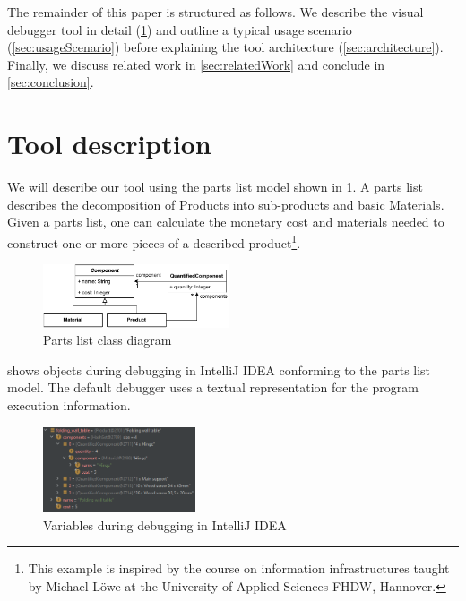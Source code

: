 \documentclass[conference]{IEEEtran}
\newcommand{\intellij}{IntelliJ IDEA}
\begin{document}
The remainder of this paper is structured as follows.
We describe the visual debugger tool in detail (\cref{sec:toolDescription}) and outline a typical usage scenario (\cref{sec:usageScenario}) before explaining the tool architecture (\cref{sec:architecture}).
Finally, we discuss related work in \cref{sec:relatedWork} and conclude in \cref{sec:conclusion}.

\section{Tool description} \label{sec:toolDescription}
We will describe our tool using the parts list model shown in \cref{fig:partsListModel}.
A parts list describes the decomposition of \textsf{Products} into sub-products and basic \textsf{Materials}.
Given a parts list, one can calculate the monetary cost and materials needed to construct one or more pieces of a described product\footnote{This example is inspired by the course on information infrastructures taught by Michael Löwe at the University of Applied Sciences FHDW, Hannover.}.

\begin{figure}[h]
    \centering
    \includegraphics[width=0.489\textwidth]{images/VD-partsList-classes.pdf}
    \caption{Parts list class diagram}
    \label{fig:partsListModel}
\end{figure}

 shows objects during debugging in \intellij{} conforming to the parts list model. 
The default debugger uses a textual representation for the program execution information.

\begin{figure}[h]
    \centering
    \includegraphics[width=0.4\textwidth]{images/variables.png}
    \caption{Variables during debugging in \intellij}
    \label{fig:variablesIntellij}
\end{figure}
\end{document}
